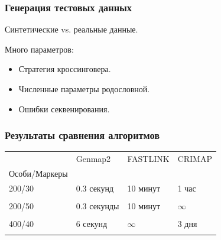 \documentclass{beamer}
\begin{document}
\begin{frame}
  \frametitle{Генерация тестовых данных}
  Синтетические vs. реальные данные.

  \medskip

  Много параметров:
  \begin{itemize}
  \item Стратегия кроссинговера.
  \item Численные параметры родословной.
  \item Ошибки секвенирования.
  \end{itemize}
\end{frame}

\begin{frame}
  \frametitle{Результаты сравнения алгоритмов}

  \begin{tabular}{|l|l|l|l|}
    \hline
    & Genmap2 & FASTLINK & CRIMAP \\
    Особи/Маркеры & & & \\
    \hline
    200/30 & 0.3 секунд & 10 минут & 1 час \\
    & & & \\
    \hline
    200/50 & 0.3 секунды & 10 минут & $ \infty $ \\
    & & & \\
    \hline
    400/40 & 6 секунд & $ \infty $ & 3 дня \\
    & & & \\
    \hline
  \end{tabular}
\end{frame}
\end{document}
